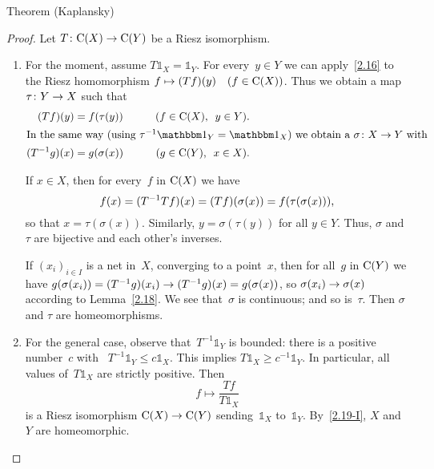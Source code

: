 \documentclass[main.tex]{subfiles}
\begin{document}
%
%
\begin{psec}{2.19}{Theorem (Kaplansky)}
\end{psec}
\begin{proof}
Let $T\colon \mathrm{C}(X)\rightarrow \mathrm{C}(Y)$ be a Riesz isomorphism.
\begin{enumerate}[label=(\Roman*)]
\item \label{2.19-I}
For the moment, assume 
$T\mathbb{1}_X = \mathbb{1}_Y$.
For every~$y\in Y$ 
we can apply~\ref{2.16} to the Riesz homomorphism
$f\mapsto (Tf)(y)\quad (f\in\mathrm{C}(X))$.
Thus we obtain a map $\tau\colon Y\rightarrow X$ such that
\begin{alignat*}{2}
(Tf)(y) &= f(\tau(y)) 
\qquad &(f\in\Cont{X}\htam{, }\ y\in Y)
\htam{.}\\
\intertext{%
In the same way (using $\tau^{-1} \mathbb{1}_Y = \mathbb{1}_X$)
we obtain a $\sigma\colon X\ra Y$ with}
(T^{-1}g)(x) &= g(\sigma(x)) 
 &(g\in \Cont{Y}\htam{, }\ x\in X)
\htam{.}
\end{alignat*}

If $x\in X$, then for every~$f$ in $\mathrm{C}(X)$ we have
\begin{equation*}
f(x) = (T^{-1} T f)(x) = (Tf)(\sigma(x)) = f(\tau(\sigma (x)))\text{,}
\end{equation*}
so that $x=\tau(\sigma(x))$.
Similarly, $y=\sigma(\tau(y))$ for all $y\in Y$.
Thus, $\sigma$ and~$\tau$ are bijective and each other's inverses.

If $(x_i)_{i \in I}$ is a net in~$X$,
converging to a point~$x$,
then for all~$g$ in $\mathrm{C}(Y)$
we have $g(\sigma(x_i))=(T^{-1} g)(x_i)\rightarrow (T^{-1}g)(x)=g(\sigma(x))$,
so $\sigma(x_i)\rightarrow \sigma(x)$ according to Lemma~\ref{2.18}.
We see that~$\sigma$ is continuous;
and so is~$\tau$.
Then $\sigma$ and $\tau$ are homeomorphisms.
%
\item \label{2.19-II}
For the general case,
observe that~$T^{-1}\mathbb{1}_Y$ is bounded:
there is a positive number~$c$ 
with ~$T^{-1}\mathbb{1}_Y \leq c \mathbb{1}_X$.
This implies $T\mathbb{1}_X \ge c^{-1} \mathbb{1}_Y$.
In particular,
all values of~$T\mathbb{1}_X$ are strictly positive.
Then
\begin{equation*}
f \mapsto \frac{Tf}{T\mathbb{1}_X}
\end{equation*}
is a Riesz isomorphism $\mathrm{C}(X)\rightarrow\mathrm{C}(Y)$
sending~$\mathbb{1}_X$ to~$\mathbb{1}_Y$.
By~\ref{2.19-I}, 
$X$ and~$Y$ are homeomorphic. \xqed
\end{enumerate}
\end{proof}
\end{document}
